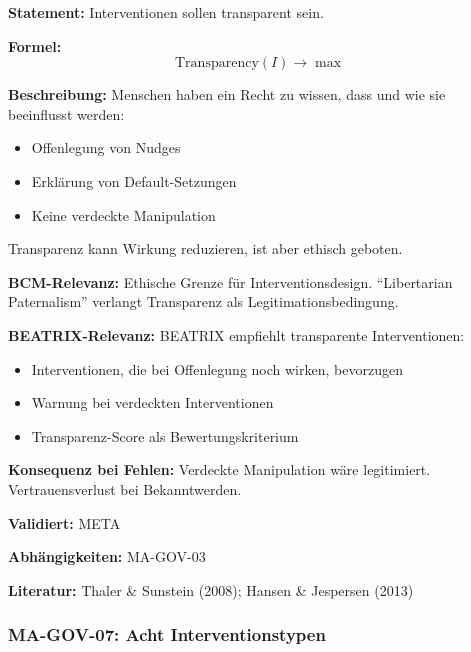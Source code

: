 \textbf{Statement:} Interventionen sollen transparent sein.

\textbf{Formel:}
\begin{equation}
\text{Transparency}(I) \rightarrow \max
\end{equation}

\textbf{Beschreibung:}
Menschen haben ein Recht zu wissen, dass und wie sie beeinflusst werden:
\begin{itemize}
    \item Offenlegung von Nudges
    \item Erklärung von Default-Setzungen
    \item Keine verdeckte Manipulation
\end{itemize}
Transparenz kann Wirkung reduzieren, ist aber ethisch geboten.

\textbf{BCM-Relevanz:}
Ethische Grenze für Interventionsdesign. ``Libertarian Paternalism'' verlangt Transparenz als Legitimationsbedingung.

\textbf{BEATRIX-Relevanz:}
BEATRIX empfiehlt transparente Interventionen:
\begin{itemize}
    \item Interventionen, die bei Offenlegung noch wirken, bevorzugen
    \item Warnung bei verdeckten Interventionen
    \item Transparenz-Score als Bewertungskriterium
\end{itemize}

\textbf{Konsequenz bei Fehlen:}
Verdeckte Manipulation wäre legitimiert. Vertrauensverlust bei Bekanntwerden.

\textbf{Validiert:} META

\textbf{Abhängigkeiten:} MA-GOV-03

\textbf{Literatur:} Thaler \& Sunstein (2008); Hansen \& Jespersen (2013)



\subsubsection*{MA-GOV-07: Acht Interventionstypen}

